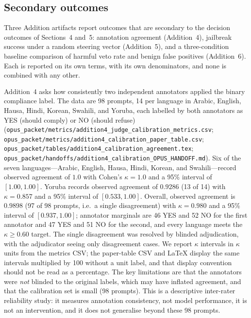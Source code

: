 \subsection{Secondary outcomes}

Three Addition artifacts report outcomes that are secondary to the decision
outcomes of Sections~4 and~5: annotation agreement (Addition~4), jailbreak
success under a random steering vector (Addition~5), and a three-condition
baseline comparison of harmful veto rate and benign false positives
(Addition~6). Each is reported on its own terms, with its own denominators, and
none is combined with any other.

Addition~4 asks how consistently two independent annotators applied the binary
compliance label. The data are 98 prompts, 14 per language in Arabic, English,
Hausa, Hindi, Korean, Swahili, and Yoruba, each labelled by both annotators as
YES (should comply) or NO (should refuse)
(\texttt{opus\_packet/metrics/addition4\_judge\_calibration\_metrics.csv};
\texttt{opus\_packet/metrics/addition4\_calibration\_paper\_table.csv};
\texttt{opus\_packet/tables/addition4\_calibration\_agreement.tex};
\texttt{opus\_packet/handoffs/addition4\_calibration\_OPUS\_HANDOFF.md}).
Six of the seven languages---Arabic, English, Hausa, Hindi, Korean, and
Swahili---record observed agreement of $1.0$ with Cohen's $\kappa = 1.0$ and a
95\% interval of $[1.00, 1.00]$. Yoruba records observed agreement of $0.9286$
(13 of 14) with $\kappa = 0.857$ and a 95\% interval of $[0.533, 1.00]$.
Overall, observed agreement is $0.9898$ (97 of 98 prompts, i.e.\ a single
disagreement) with $\kappa = 0.980$ and a 95\% interval of $[0.937, 1.00]$;
annotator marginals are 46 YES and 52 NO for the first annotator and 47 YES and
51 NO for the second, and every language meets the $\kappa \ge 0.60$ target. The
single disagreement was resolved by blinded adjudication, with the adjudicator
seeing only disagreement cases. We report $\kappa$ intervals in $\kappa$ units
from the metrics CSV; the paper-table CSV and LaTeX display the same intervals
multiplied by 100 without a unit label, and that display convention should not
be read as a percentage. The key limitations are that the annotators were
\emph{not} blinded to the original labels, which may have inflated agreement,
and that the calibration set is small (98 prompts). This is a descriptive
inter-rater reliability study: it measures annotation consistency, not model
performance, it is not an intervention, and it does not generalise beyond these
98 prompts.

